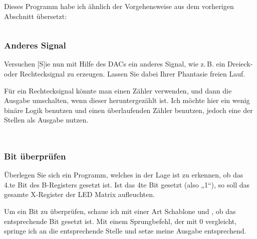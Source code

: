 \inputminted[fontsize=\small, linenos]{cpp}{../Prototypen/d.cpp}

\begin{multicols}{9}
	\inputminted[fontsize=\footnotesize]{text}{d.txt}
\end{multicols}

Dieses Programm habe ich ähnlich der Vorgehensweise aus dem vorherigen
Abschnitt übersetzt:

\inputminted[fontsize=\small, linenos]{text}{../Assembly/a.s}

\subsubsection{Anderes Signal}

\begin{problem}
	Versuchen [S]ie nun mit Hilfe des DACs ein anderes Signal, wie z.\,B. ein
	Dreieck- oder Rechtecksignal zu erzeugen. Lassen Sie dabei Ihrer Phantasie
	freien Lauf.
\end{problem}

Für ein Rechtecksignal könnte man einen Zähler verwenden, und dann die Ausgabe
umschalten, wenn dieser heruntergezählt ist. Ich möchte hier ein wenig binäre
Logik benutzen und einen überlaufenden Zähler benutzen, jedoch eine der Stellen
als Ausgabe nutzen.

\inputminted[fontsize=\small, linenos]{cpp}{../Prototypen/e.cpp}

\begin{multicols}{9}
	\inputminted[fontsize=\footnotesize]{text}{e.txt}
\end{multicols}

\subsubsection{Bit überprüfen}

\begin{problem}
	Überlegen Sie sich ein Programm, welches in der Lage ist zu erkennen, ob
	das 4.te Bit des B-Registers gesetzt ist. Ist das 4te Bit gesetzt (also
	„1“), so soll das gesamte X-Register der LED Matrix aufleuchten.
\end{problem}

Um ein Bit zu überprüfen, schaue ich mit einer Art Schablone und \txor, ob das
entsprechende Bit gesetzt ist. Mit einem Sprungbefehl, der mit 0 vergleicht,
springe ich an die entsprechende Stelle und setze meine Ausgabe entsprechend.

\inputminted[fontsize=\small, linenos]{cpp}{../Prototypen/f.cpp}

